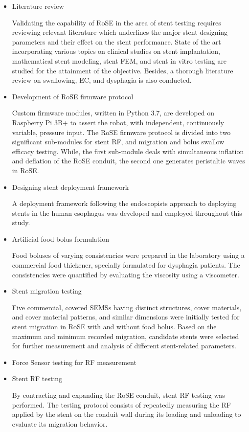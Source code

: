 \begin{itemize}
	\item Literature review
	
	Validating the capability of \ac{RoSE} in the area of stent testing requires reviewing relevant literature which underlines the major stent designing parameters and their effect on the stent performance. State of the art incorporating various topics on clinical studies on stent implantation, mathematical stent modeling, stent \ac{FEM}, and stent in vitro testing are studied for the attainment of the objective.  Besides, a thorough literature review on swallowing, \ac{EC}, and dysphagia is also conducted. 
	
	\item Development of RoSE firmware protocol
	
	Custom firmware modules, written in Python 3.7, are developed on Raspberry Pi 3B+ to assert the robot, with independent, continuously variable, pressure input. The \ac{RoSE} firmware protocol is divided into two significant sub-modules for stent \ac{RF}, and migration and bolus swallow efficacy testing. While, the first sub-module deals with simultaneous inflation and deflation of the \ac{RoSE} conduit, the second one generates peristaltic waves in \ac{RoSE}.
	
	\item Designing stent deployment framework
	
	A deployment framework following the endoscopists approach to deploying stents in the human esophagus was developed and employed throughout this study. 
	
	\item Artificial food bolus formulation
	
	Food boluses of varying consistencies were prepared in the laboratory using a commercial food thickener, specially formulated for dysphagia patients. The consistencies were quantified by evaluating the viscosity using a viscometer.
	
	\item Stent migration testing
	
	Five commercial, covered \ac{SEMS}s having distinct structures, cover materials, and cover material patterns, and similar dimensions were initially tested for stent migration in \ac{RoSE} with and without food bolus. Based on the maximum and minimum recorded migration,  candidate stents were selected for further measurement and analysis of different stent-related parameters.
	
	\item Force Sensor testing for RF measurement
	
	\item Stent RF testing
	
	By contracting and expanding the \ac{RoSE} conduit, stent \ac{RF} testing was performed. The testing protocol consists of repeatedly measuring the \ac{RF} applied by the stent on the conduit wall during its loading and unloading to evaluate its migration behavior. 
\end{itemize}

